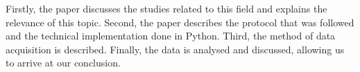Firstly, the paper discusses the studies related to this field and explains the relevance of this topic. Second, the paper describes the protocol that was followed and the technical implementation done in Python. Third, the method of data acquisition is described. Finally, the data is analysed and discussed, allowing us to arrive at our conclusion.

